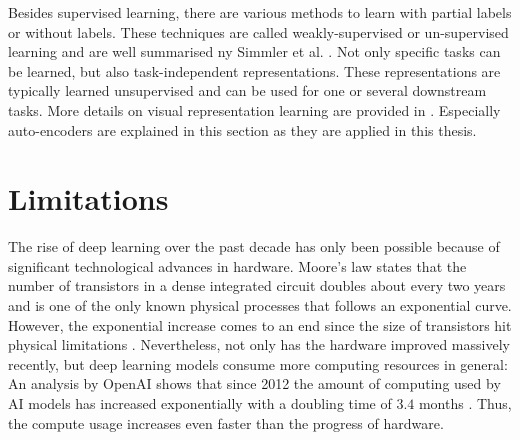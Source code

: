 Besides supervised learning, there are various methods to learn with partial labels or without labels.
These techniques are called weakly-supervised or un-supervised learning and are well summarised ny Simmler et al. .
Not only specific tasks can be learned, but also task-independent representations.
These representations are typically learned unsupervised and can be used for one or several downstream tasks.
More details on visual representation learning are provided in .
Especially auto-encoders  are explained in this section as they are applied in this thesis.


\section{Limitations}
The rise of deep learning over the past decade has only been possible because of significant technological advances in hardware.
Moore's law  states that the number of transistors in a dense integrated circuit doubles about every two years and is one of the only known physical processes that follows an exponential curve.
However, the exponential increase comes to an end since the size of transistors hit physical limitations .
Nevertheless, not only has the hardware improved massively recently, but deep learning models consume more computing resources in general:
An analysis by OpenAI shows that since 2012 the amount of computing used by AI models has increased exponentially with a doubling time of \(3.4\) months .
Thus, the compute usage increases even faster than the progress of hardware.

